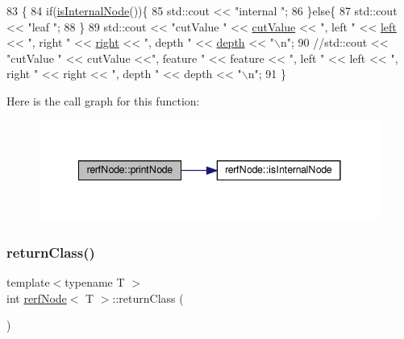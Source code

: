 \begin{DoxyCode}
83                                 \{
84             \textcolor{keywordflow}{if}(\hyperlink{classrerfNode_ace2de533e796bc163c5da0b183746e69}{isInternalNode}())\{
85                 std::cout << \textcolor{stringliteral}{"internal "};
86             \}\textcolor{keywordflow}{else}\{
87                 std::cout << \textcolor{stringliteral}{"leaf "};
88             \}
89             std::cout << \textcolor{stringliteral}{"cutValue "} << \hyperlink{classrerfNode_afbb93d044e16d18d7502e5d58fa345bf}{cutValue} << \textcolor{stringliteral}{", left "} << \hyperlink{classrerfNode_a0ffbd4e13914bfdd0d35e2e737b0a959}{left} << \textcolor{stringliteral}{", right "} << 
      \hyperlink{classrerfNode_ae04521c833fe33f2b1cde19bb3cb615f}{right} << \textcolor{stringliteral}{", depth "} << \hyperlink{classrerfNode_a85845e08b7db33d241ddc3ff6b63799f}{depth} << \textcolor{stringliteral}{"\(\backslash\)n"};
90             \textcolor{comment}{//std::cout << "cutValue " << cutValue <<", feature " << feature << ", left " << left << ",
       right " << right << ", depth " << depth << "\(\backslash\)n";}
91         \}
\end{DoxyCode}
Here is the call graph for this function\+:
\nopagebreak
\begin{figure}[H]
\begin{center}
\leavevmode
\includegraphics[width=341pt]{classrerfNode_afc097136492957d5cd96269addcfb413_cgraph}
\end{center}
\end{figure}
\mbox{\label{classrerfNode_a48a5c0d5ae3fd5f59791065f5bc54367}} 
\subsubsection{\texorpdfstring{return\+Class()}{returnClass()}}
{\footnotesize\ttfamily template$<$typename T $>$ \\
int \hyperlink{classrerfNode}{rerf\+Node}$<$ T $>$\+::return\+Class (\begin{DoxyParamCaption}{ }\end{DoxyParamCaption})\hspace{0.3cm}{\ttfamily [inline]}}



